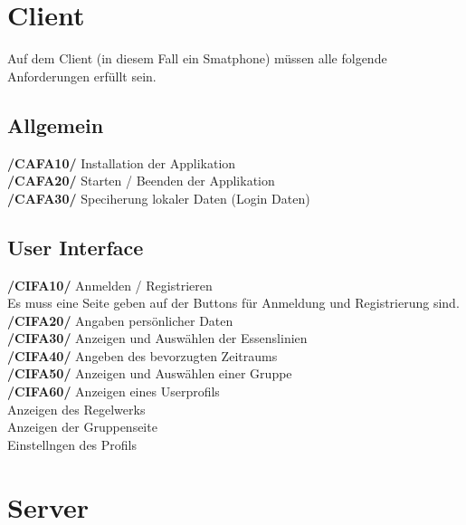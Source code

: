 \documentclass[a4paper]{scrreprt}
\begin{document}
\section{Client}
Auf dem Client (in diesem Fall ein Smatphone) müssen alle folgende Anforderungen erfüllt sein. 

\subsection{Allgemein}

\begin{addmargin}[25pt]{0pt} 
\textbf{/CAFA10/} Installation der Applikation \\
\textbf{/CAFA20/} Starten / Beenden der Applikation\\
\textbf{/CAFA30/} Speciherung lokaler Daten (Login Daten)\\
\end{addmargin}

\subsection{User Interface}

\begin{addmargin}[25pt]{0pt} 
\textbf{/CIFA10/} Anmelden / Registrieren \\
Es muss eine Seite geben auf der Buttons für Anmeldung und Registrierung sind.
\textbf{/CIFA20/} Angaben persönlicher Daten\\
\textbf{/CIFA30/} Anzeigen und Auswählen der Essenslinien\\
\textbf{/CIFA40/} Angeben des bevorzugten Zeitraums\\
\textbf{/CIFA50/} Anzeigen und Auswählen einer Gruppe\\
\textbf{/CIFA60/} Anzeigen eines Userprofils\\
Anzeigen des Regelwerks\\
Anzeigen der Gruppenseite\\
Einstellngen des Profils\\
\end{addmargin}

\section{Server}
\end{document}
